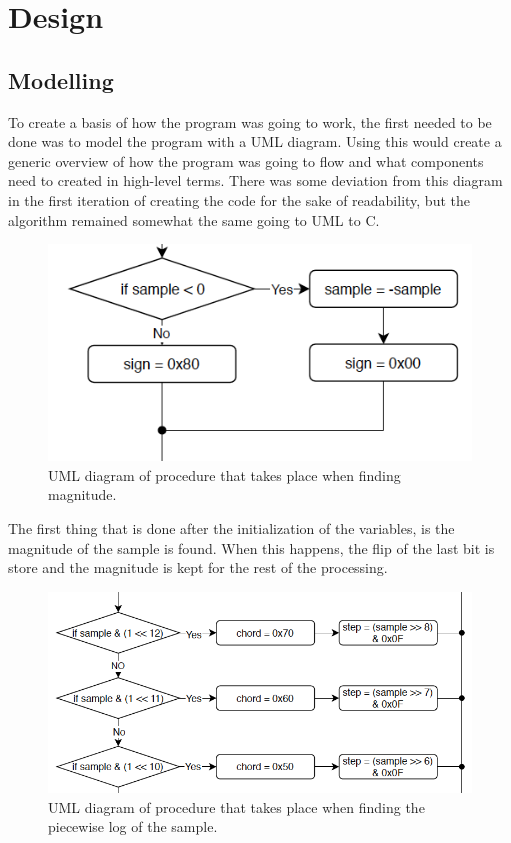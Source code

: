 \documentclass[12pt]{article}
\begin{document}
\section{Design}

\subsection{Modelling}

To create a basis of how the program was going to work, the first needed to be done was to model the program with a UML diagram. Using this would create a generic overview of how the program was going to flow and what components need to created in high-level terms. There was some deviation from this diagram in the first iteration of creating the code for the sake of readability, but the algorithm remained somewhat the same going to UML to C. 

\begin{figure}[!h]
	\centering
	\includegraphics[scale=1]{mag_uml.png}
	\caption{\label{fig:mag_uml}UML diagram of procedure that takes place when finding magnitude.}
\end{figure}

The first thing that is done after the initialization of the variables, is the magnitude of the sample is found. When this happens, the flip of the last bit is store and the magnitude is kept for the rest of the processing. \\

\begin{figure}[!h]
	\centering
	\includegraphics[scale=1]{step_uml.png}
	\caption{UML diagram of procedure that takes place when finding the piecewise log of the sample.}
\end{figure}
\end{document}
